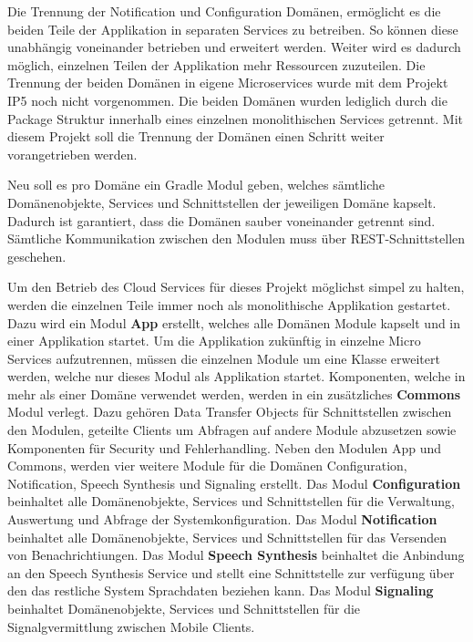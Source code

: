 Die Trennung der Notification und Configuration Domänen, ermöglicht es die beiden Teile der Applikation in separaten Services zu betreiben.
So können diese unabhängig voneinander betrieben und erweitert werden.
Weiter wird es dadurch möglich, einzelnen Teilen der Applikation mehr Ressourcen zuzuteilen.
Die Trennung der beiden Domänen in eigene Microservices wurde mit dem Projekt IP5 noch nicht vorgenommen.
Die beiden Domänen wurden lediglich durch die Package Struktur innerhalb eines einzelnen monolithischen Services getrennt.
Mit diesem Projekt soll die Trennung der Domänen einen Schritt weiter vorangetrieben werden.

Neu soll es pro Domäne ein Gradle Modul geben, welches sämtliche Domänenobjekte, Services und Schnittstellen der jeweiligen Domäne kapselt.
Dadurch ist garantiert, dass die Domänen sauber voneinander getrennt sind.
Sämtliche Kommunikation zwischen den Modulen muss über REST-Schnittstellen geschehen.

Um den Betrieb des Cloud Services für dieses Projekt möglichst simpel zu halten, werden die einzelnen Teile immer noch als monolithische Applikation gestartet.
Dazu wird ein Modul \textbf{App} erstellt, welches alle Domänen Module kapselt und in einer Applikation startet.
Um die Applikation zukünftig in einzelne Micro Services aufzutrennen, müssen die einzelnen Module um eine Klasse erweitert werden, welche nur dieses Modul als Applikation startet.
Komponenten, welche in mehr als einer Domäne verwendet werden, werden in ein zusätzliches \textbf{Commons} Modul verlegt.
Dazu gehören Data Transfer Objects für Schnittstellen zwischen den Modulen, geteilte Clients um Abfragen auf andere Module abzusetzen sowie Komponenten für Security und Fehlerhandling.
Neben den Modulen App und Commons, werden vier weitere Module für die Domänen Configuration, Notification, Speech Synthesis und Signaling erstellt.
Das Modul \textbf{Configuration} beinhaltet alle Domänenobjekte, Services und Schnittstellen für die Verwaltung, Auswertung und Abfrage der Systemkonfiguration.
Das Modul \textbf{Notification} beinhaltet alle Domänenobjekte, Services und Schnittstellen für das Versenden von Benachrichtiungen.
Das Modul \textbf{Speech Synthesis} beinhaltet die Anbindung an den Speech Synthesis Service und stellt eine Schnittstelle zur verfügung über den das restliche System Sprachdaten beziehen kann.
Das Modul \textbf{Signaling} beinhaltet Domänenobjekte, Services und Schnittstellen für die Signalgvermittlung zwischen Mobile Clients.

\clearpage
